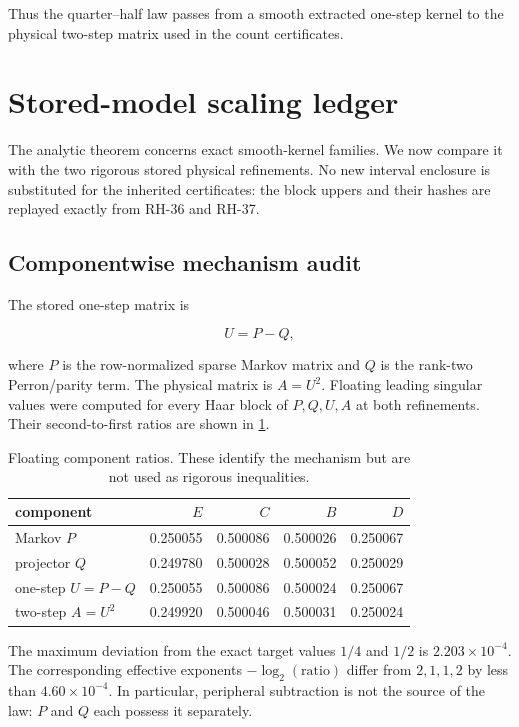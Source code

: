 \documentclass[11pt]{article}
\theoremstyle{definition}
\theoremstyle{remark}
\begin{document}
Thus the quarter--half law passes from a smooth extracted one-step kernel to
the physical two-step matrix used in the count certificates.

\section{Stored-model scaling ledger}
\label{sec:ledger}

The analytic theorem concerns exact smooth-kernel families.  We now compare it
with the two rigorous stored physical refinements.  No new interval enclosure
is substituted for the inherited certificates: the block uppers and their
hashes are replayed exactly from RH-36 and RH-37.

\subsection{Componentwise mechanism audit}

The stored one-step matrix is

\[
U=P-Q,
\]

where $P$ is the row-normalized sparse Markov matrix and $Q$ is the rank-two
Perron/parity term.  The physical matrix is $A=U^2$.  Floating leading
singular values were computed for every Haar block of $P,Q,U,A$ at both
refinements.  Their second-to-first ratios are shown in
\cref{tab:component-ratios}.

\begin{table}[H]
\centering
\caption{Floating component ratios.  These identify the mechanism but are not
used as rigorous inequalities.}
\label{tab:component-ratios}
\begin{tabular}{lrrrr}
\toprule
component & $E$ & $C$ & $B$ & $D$\\
\midrule
Markov $P$ & 0.250055 & 0.500086 & 0.500026 & 0.250067\\
projector $Q$ & 0.249780 & 0.500028 & 0.500052 & 0.250029\\
one-step $U=P-Q$ & 0.250055 & 0.500086 & 0.500024 & 0.250067\\
two-step $A=U^2$ & 0.249920 & 0.500046 & 0.500031 & 0.250024\\
\bottomrule
\end{tabular}
\end{table}

The maximum deviation from the exact target values $1/4$ and $1/2$ is
$2.203\times10^{-4}$.  The corresponding effective exponents
$-\log_2(\text{ratio})$ differ from $2,1,1,2$ by less than
$4.60\times10^{-4}$.  In particular, peripheral subtraction is not the source
of the law: $P$ and $Q$ each possess it separately.
\end{document}
